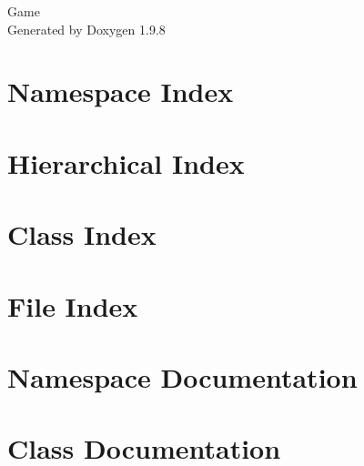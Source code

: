 \documentclass[twoside]{book}
\newcommand{\+}{\discretionary{\mbox{\scriptsize$\hookleftarrow$}}{}{}}
\newcommand{\clearemptydoublepage}{%
    \newpage{\pagestyle{empty}\cleardoublepage}%
  }
\begin{document}
  \raggedbottom
    \hypersetup{pageanchor=false,
                bookmarksnumbered=true,
                pdfencoding=unicode
               }
  \begin{titlepage}
  \vspace*{7cm}
  \begin{center}%
  {\Large Game}\\
  \vspace*{1cm}
  {\large Generated by Doxygen 1.9.8}\\
  \end{center}
  \end{titlepage}
  \clearemptydoublepage
  \tableofcontents
  \clearemptydoublepage
  \hypersetup{pageanchor=true}
\chapter{Namespace Index}

\chapter{Hierarchical Index}

\chapter{Class Index}

\chapter{File Index}

\chapter{Namespace Documentation}

\chapter{Class Documentation}





















\end{document}
